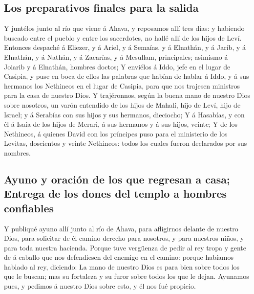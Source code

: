 \hypertarget{los-preparativos-finales-para-la-salida}{%
\subsection{Los preparativos finales para la
salida}\label{los-preparativos-finales-para-la-salida}}

 Y juntélos junto al río que viene á Ahava, y reposamos
allí tres días: y habiendo buscado entre el pueblo y entre los
sacerdotes, no hallé allí de los hijos de Leví.  Entonces
despaché á Eliezer, y á Ariel, y á Semaías, y á Elnathán, y á Jarib, y á
Elnathán, y á Nathán, y á Zacarías, y á Mesullam, principales; asimismo
á Joiarib y á Elnathán, hombres doctos;  Y enviélos á Iddo,
jefe en el lugar de Casipia, y puse en boca de ellos las palabras que
habían de hablar á Iddo, y á sus hermanos los Nethineos en el lugar de
Casipia, para que nos trajesen ministros para la casa de nuestro Dios.
 Y trajéronnos, según la buena mano de nuestro Dios sobre
nosotros, un varón entendido de los hijos de Mahalí, hijo de Leví, hijo
de Israel; y á Serabías con sus hijos y sus hermanos, dieciocho;
 Y á Hasabías, y con él á Isaía de los hijos de Merari, á
sus hermanos y á sus hijos, veinte;  Y de los Nethineos, á
quienes David con los príncipes puso para el ministerio de los Levitas,
doscientos y veinte Nethineos: todos los cuales fueron declarados por
sus nombres.

\hypertarget{ayuno-y-oraciuxf3n-de-los-que-regresan-a-casa-entrega-de-los-dones-del-templo-a-hombres-confiables}{%
\subsection{Ayuno y oración de los que regresan a casa; Entrega de los
dones del templo a hombres
confiables}\label{ayuno-y-oraciuxf3n-de-los-que-regresan-a-casa-entrega-de-los-dones-del-templo-a-hombres-confiables}}

 Y publiqué ayuno allí junto al río de Ahava, para
afligirnos delante de nuestro Dios, para solicitar de él camino derecho
para nosotros, y para nuestros niños, y para toda nuestra hacienda.
 Porque tuve vergüenza de pedir al rey tropa y gente de á
caballo que nos defendiesen del enemigo en el camino: porque habíamos
hablado al rey, diciendo: La mano de nuestro Dios es para bien sobre
todos los que le buscan; mas su fortaleza y su furor sobre todos los que
le dejan.  Ayunamos pues, y pedimos á nuestro Dios sobre
esto, y él nos fué propicio.

